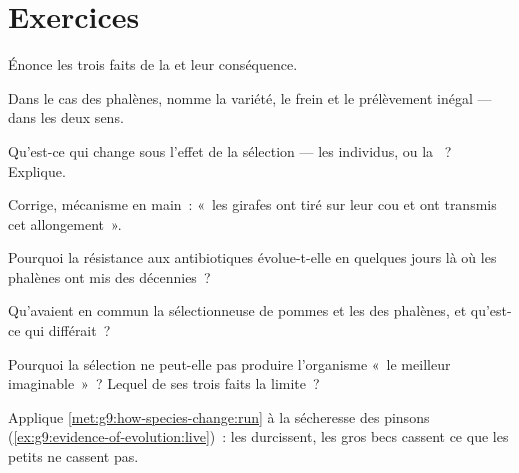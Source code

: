 \section{Exercices}

\begin{exercise}[$\star$]\label{exo:g9:how-species-change:1}
Énonce les trois faits de la  et leur
conséquence.
\end{exercise}

\begin{exercise}[$\star$]\label{exo:g9:how-species-change:2}
Dans le cas des phalènes, nomme la variété, le frein et le
prélèvement inégal --- dans les deux sens.
\end{exercise}

\begin{exercise}[$\star$]\label{exo:g9:how-species-change:3}
Qu'est-ce qui change sous l'effet de la sélection --- les
individus, ou la ~? Explique.
\end{exercise}

\begin{exercise}[$\star$]\label{exo:g9:how-species-change:4}
Corrige, mécanisme en main~: «~les girafes ont tiré sur
leur cou et ont transmis cet allongement~».
\end{exercise}

\begin{exercise}[$\star$]\label{exo:g9:how-species-change:5}
Pourquoi la résistance aux antibiotiques évolue-t-elle en
quelques jours là où les phalènes ont mis des décennies~?
\end{exercise}

\begin{exercise}[$\star$]\label{exo:g9:how-species-change:6}
Qu'avaient en commun la sélectionneuse de pommes et les
 des phalènes, et qu'est-ce qui différait~?
\end{exercise}

\begin{exercise}[$\star\star$]\label{exo:g9:how-species-change:7}
Pourquoi la sélection ne peut-elle pas produire
l'organisme «~le meilleur imaginable~»~? Lequel de ses
trois faits la limite~?
\end{exercise}

\begin{exercise}[$\star\star$]\label{exo:g9:how-species-change:8}
Applique \cref{met:g9:how-species-change:run} à la
sécheresse des pinsons
(\cref{ex:g9:evidence-of-evolution:live})~: les 
durcissent, les gros becs cassent ce que les petits ne
cassent pas.
\end{exercise}

